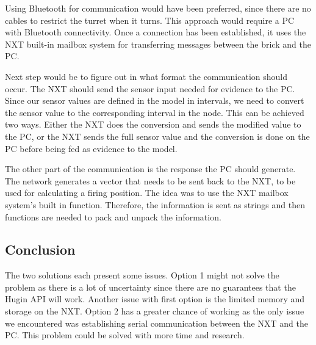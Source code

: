 Using Bluetooth for communication would have been preferred, since there are
no cables to restrict the turret when it turns.
This approach would require a PC with Bluetooth connectivity. Once a connection
has been established, it uses the NXT built-in mailbox system for transferring
messages between the brick and the PC.\nl

Next step would be to figure out in what format the communication should occur.
The NXT should send the sensor input needed for evidence to the PC. Since our
sensor values are defined in the model in intervals, we need to convert the
sensor value to the corresponding interval in the node. This can be achieved two ways. Either the NXT does the conversion and sends the modified value to the PC, or the NXT
sends the full sensor value and the conversion is done on the PC before
being fed as evidence to the model.\nl

The other part of the communication is the response the PC should generate. The
network generates a vector that needs to be sent back to the NXT, to be used for
calculating a firing position. The idea was to use the NXT mailbox system's
built in  function. Therefore, the information is sent as
strings and then functions are needed to pack and unpack the information.

\subsection{Conclusion}
The two solutions each present some issues. Option 1 might not solve the
problem as there is a lot of uncertainty since there are no guarantees that the Hugin
API will work. Another issue with first option is the limited memory and storage
on the NXT. Option 2 has a greater chance of working as the only issue we
encountered was establishing serial communication between the NXT and the PC.
This problem could be solved with more time and research.


